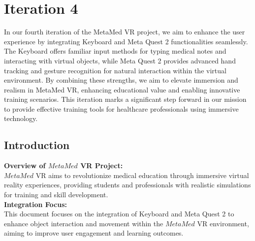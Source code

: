 \chapter{Iteration 4}
\label{ch:iter4}
In our fourth iteration of the MetaMed VR project, we aim to enhance the user experience by integrating Keyboard and Meta Quest 2 functionalities seamlessly. The Keyboard offers familiar input methods for typing medical notes and interacting with virtual objects, while Meta Quest 2 provides advanced hand tracking and gesture recognition for natural interaction within the virtual environment. By combining these strengths, we aim to elevate immersion and realism in MetaMed VR, enhancing educational value and enabling innovative training scenarios. This iteration marks a significant step forward in our mission to provide effective training tools for healthcare professionals using immersive technology.
\section{Introduction}
\textbf{Overview of $MetaMed$ VR Project:}\\
$MetaMed$ VR aims to revolutionize medical education through immersive virtual reality experiences, providing students and professionals with realistic simulations for training and skill development.\\
\textbf{Integration Focus:}\\
This document focuses on the integration of Keyboard and Meta Quest 2 to enhance object interaction and movement within the $Meta Med$ VR environment, aiming to improve user engagement and learning outcomes.
